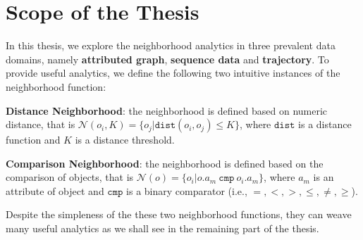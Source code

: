 \section{Scope of the Thesis}
In this thesis, we explore the neighborhood analytics in
three prevalent data domains, namely \textbf{attributed graph},
\textbf{sequence data} and \textbf{trajectory}. 
To provide useful analytics, we define the following
two intuitive instances of the neighborhood function:

\textbf{Distance Neighborhood}: the neighborhood is defined based on numeric distance, that is $\mathcal{N}(o_i,K) = \{o_j | \mathtt{dist}(o_i,o_j) \leq K \}$, where $\mathtt{dist}$ is a distance function and $K$ is a distance threshold.

\textbf{Comparison Neighborhood}: the neighborhood is defined based on the comparison of objects, that is $\mathcal{N}(o) = \{o_i | o.a_m \ \mathtt{cmp} \ o_i.a_m\}$, where $a_m$ is an attribute of object
and $\mathtt{cmp}$ is a binary comparator (i.e., $=,<,>,\leq,\neq,\geq$).

Despite the simpleness of the these two neighborhood functions, they can weave many useful analytics as we shall see in the remaining part of the thesis.
%

%
%
%


